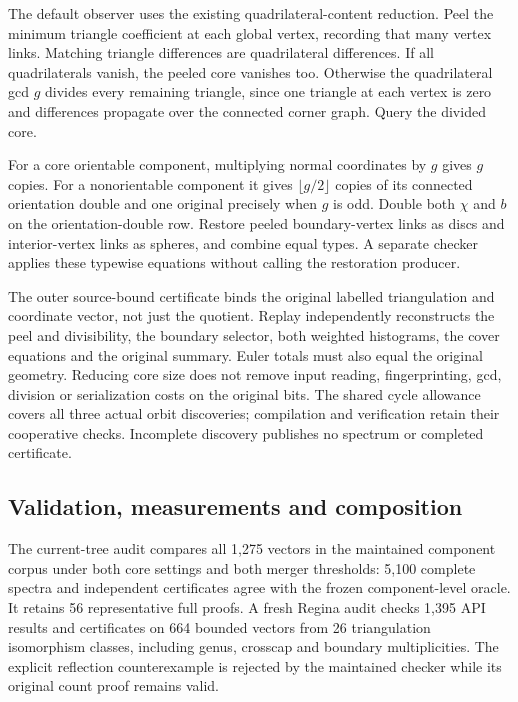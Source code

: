 The default observer uses the existing quadrilateral-content reduction.
Peel the minimum triangle coefficient at each global vertex, recording
that many vertex links. Matching triangle differences are quadrilateral
differences. If all quadrilaterals vanish, the peeled core vanishes too.
Otherwise the quadrilateral gcd $g$ divides every remaining triangle,
since one triangle at each vertex is zero and differences propagate over
the connected corner graph. Query the divided core.

For a core orientable component, multiplying normal coordinates by $g$
gives $g$ copies. For a nonorientable component it gives $\lfloor g/2\rfloor$
copies of its connected orientation double and one original precisely when
$g$ is odd. Double both $\chi$ and $b$ on the orientation-double row.
Restore peeled boundary-vertex links as discs and interior-vertex links
as spheres, and combine equal types. A separate checker applies these
typewise equations without calling the restoration producer.

The outer source-bound certificate binds the original labelled triangulation
and coordinate vector, not just the quotient. Replay independently reconstructs
the peel and divisibility, the boundary selector, both weighted histograms,
the cover equations and the original summary. Euler totals must also equal
the original geometry. Reducing core size does not remove input reading,
fingerprinting, gcd, division or serialization costs on the original bits.
The shared cycle allowance covers all three actual orbit discoveries;
compilation and verification retain their cooperative checks. Incomplete
discovery publishes no spectrum or completed certificate.

\subsection{Validation, measurements and composition}

The current-tree audit compares all 1,275 vectors in the maintained
component corpus under both core settings and both merger thresholds:
5,100 complete spectra and independent certificates agree with the frozen
component-level oracle. It retains 56 representative full proofs. A fresh
Regina audit checks 1,395 API results and certificates on 664 bounded vectors
from 26 triangulation isomorphism classes, including genus, crosscap and
boundary multiplicities. The explicit reflection counterexample is rejected
by the maintained checker while its original count proof remains valid.


